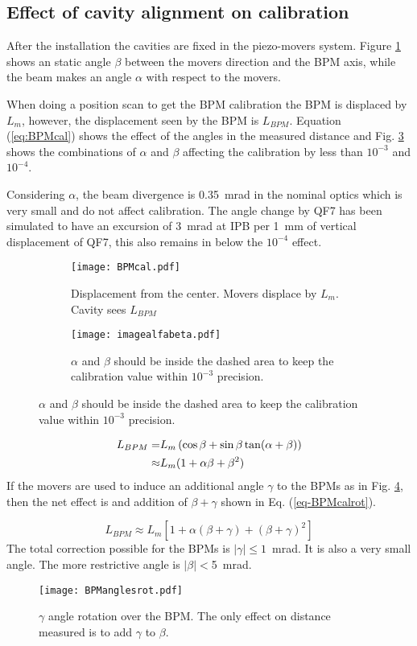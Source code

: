 \subsection{Effect of cavity alignment on calibration}
After the installation the cavities are fixed in the piezo-movers system. Figure \ref{f-BPMcal} shows an static angle $\beta$ between the movers direction and the BPM axis, while the beam makes an angle $\alpha$ with respect to the movers.\par
When doing a position scan to get the BPM calibration the BPM is displaced by $L_m$, however, the displacement seen by the BPM is $L_{BPM}$. Equation (\ref{eq:BPMcal}) shows the effect of the angles in the measured distance and Fig. \ref{f-imagealfabeta} shows the combinations of $\alpha$ and $\beta$ affecting the calibration by less than $10^{-3}$ and $10^{-4}$.\par
Considering $\alpha$, the beam divergence is 0.35~mrad in the nominal optics which is very small and do not affect calibration. The angle change by QF7 has been simulated to have an excursion of 3~mrad at IPB per 1~mm of vertical displacement of QF7, this also remains in below the $10^{-4}$ effect.\par
\begin{figure}[htb]
\centering\hspace*{0.6cm}
\begin{subfigure}{0.4\textwidth}
  \texttt{[image: BPMcal.pdf]}\caption{Displacement from the center. Movers displace by $L_m$. Cavity sees $L_{BPM}$}\label{f-BPMcal}
 \end{subfigure}\hspace*{0.5cm}
 \begin{subfigure}{0.4\textwidth}
  \texttt{[image: imagealfabeta.pdf]}\caption{$\alpha$ and $\beta$ should be inside the dashed area to keep the calibration value within $10^{-3}$ precision.}\label{f-imagealfabeta}
 \end{subfigure}
\end{figure}
\begin{align}
 L_{BPM}=&L_m\left(\cos\beta+\sin\beta\tan(\alpha+\beta)\right)\notag\\
 \approx&L_m(1+\alpha\beta+\beta^2)\label{eq:BPMcal}
\end{align}
If the movers are used to induce an additional angle $\gamma$ to the BPMs as in Fig. \ref{f-BPManglesrot}, then the net effect is and addition of $\beta+\gamma$ shown in Eq. (\ref{eq-BPMcalrot}).\par
\begin{equation}
 L_{BPM}\approx L_m[1+\alpha(\beta+\gamma)+(\beta+\gamma)^2]\label{eq-BPMcalrot}
\end{equation}
The total correction possible for the BPMs is $|\gamma|\leq1$~mrad. It is also a very small angle. The more restrictive angle is $|\beta|<$5~mrad.\par
\begin{figure}[htb]
 \centering
  \texttt{[image: BPManglesrot.pdf]}\caption{$\gamma$ angle rotation over the BPM. The only effect on distance measured is to add $\gamma$ to $\beta$.}\label{f-BPManglesrot}
\end{figure}
